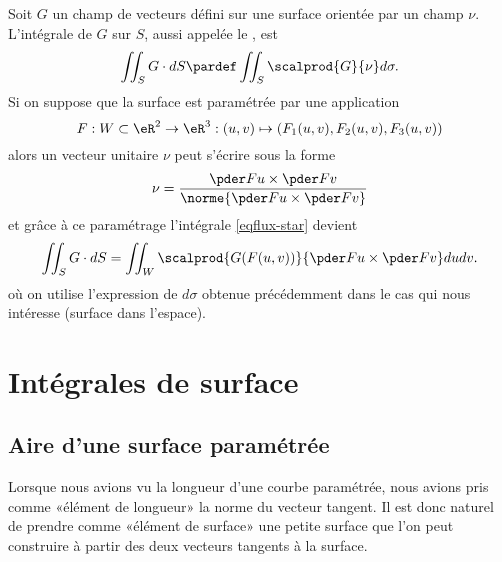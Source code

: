 Soit \( G\) un champ de vecteurs défini sur une surface orientée par un
champ \( \nu\). L'intégrale de \( G\) sur \( S\), aussi appelée le , est
\begin{equation}\label{eqflux-star}
	\iint_S G \cdot d S \pardef \iint_S \scalprod{G}{\nu} d \sigma.
\end{equation}
Si on suppose que la surface est paramétrée par une application
\begin{equation*}
	F : W \subset \eR^2 \to \eR^3 : (u,v) \mapsto (F_1(u,v),F_2(u,v),F_3(u,v))
\end{equation*}
alors un vecteur unitaire \( \nu\) peut s'écrire sous la forme
\begin{equation*}
	\nu = \frac{\pder F u \times \pder F v}{\norme{\pder F u \times \pder F v}}
\end{equation*}
et grâce à ce paramétrage l'intégrale \eqref{eqflux-star}
devient
\begin{equation*}
	\iint_S G \cdot d S = \iint_W \scalprod{G(F(u,v))}{\pder F u \times \pder F v} d u
	d v.
\end{equation*}
où on utilise l'expression de \( d \sigma\) obtenue précédemment dans le cas qui nous intéresse (surface dans l'espace).

\section{Intégrales de surface}

\subsection{Aire d'une surface paramétrée}

Lorsque nous avions vu la longueur d'une courbe paramétrée, nous avions pris comme «élément de longueur» la norme du vecteur tangent. Il est donc naturel de prendre comme «élément de surface» une petite surface que l'on peut construire à partir des deux vecteurs tangents à la surface.

